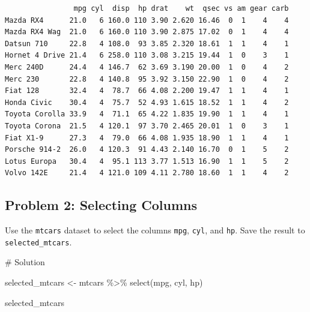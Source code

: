 \documentclass[
  letterpaper,
  DIV=11,
  numbers=noendperiod]{scrreprt}
\newenvironment{Shaded}{\begin{snugshade}}{\end{snugshade}}
\newcommand{\CommentTok}[1]{\textcolor[rgb]{0.37,0.37,0.37}{#1}}
\newcommand{\FunctionTok}[1]{\textcolor[rgb]{0.28,0.35,0.67}{#1}}
\newcommand{\NormalTok}[1]{\textcolor[rgb]{0.00,0.23,0.31}{#1}}
\newcommand{\OtherTok}[1]{\textcolor[rgb]{0.00,0.23,0.31}{#1}}
\newcommand{\SpecialCharTok}[1]{\textcolor[rgb]{0.37,0.37,0.37}{#1}}
\begin{document}
\begin{verbatim}
                mpg cyl  disp  hp drat    wt  qsec vs am gear carb
Mazda RX4      21.0   6 160.0 110 3.90 2.620 16.46  0  1    4    4
Mazda RX4 Wag  21.0   6 160.0 110 3.90 2.875 17.02  0  1    4    4
Datsun 710     22.8   4 108.0  93 3.85 2.320 18.61  1  1    4    1
Hornet 4 Drive 21.4   6 258.0 110 3.08 3.215 19.44  1  0    3    1
Merc 240D      24.4   4 146.7  62 3.69 3.190 20.00  1  0    4    2
Merc 230       22.8   4 140.8  95 3.92 3.150 22.90  1  0    4    2
Fiat 128       32.4   4  78.7  66 4.08 2.200 19.47  1  1    4    1
Honda Civic    30.4   4  75.7  52 4.93 1.615 18.52  1  1    4    2
Toyota Corolla 33.9   4  71.1  65 4.22 1.835 19.90  1  1    4    1
Toyota Corona  21.5   4 120.1  97 3.70 2.465 20.01  1  0    3    1
Fiat X1-9      27.3   4  79.0  66 4.08 1.935 18.90  1  1    4    1
Porsche 914-2  26.0   4 120.3  91 4.43 2.140 16.70  0  1    5    2
Lotus Europa   30.4   4  95.1 113 3.77 1.513 16.90  1  1    5    2
Volvo 142E     21.4   4 121.0 109 4.11 2.780 18.60  1  1    4    2
\end{verbatim}

\subsection*{Problem 2: Selecting
Columns}\label{problem-2-selecting-columns}

Use the \texttt{mtcars} dataset to select the columns \texttt{mpg},
\texttt{cyl}, and \texttt{hp}. Save the result to
\texttt{selected\_mtcars}.

\begin{Shaded}
\begin{Highlighting}[]
\CommentTok{\# Solution}

\NormalTok{selected\_mtcars }\OtherTok{\textless{}{-}}\NormalTok{ mtcars }\SpecialCharTok{\%\textgreater{}\%}
  \FunctionTok{select}\NormalTok{(mpg, cyl, hp)}

\NormalTok{selected\_mtcars}
\end{Highlighting}
\end{Shaded}
\end{document}
